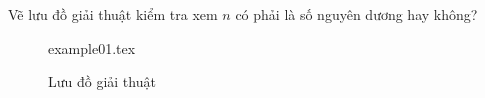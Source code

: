\documentclass[12pt,a4paper]{article}
\begin{document}
Vẽ lưu đồ giải thuật kiểm tra xem \(n\) có phải là số nguyên dương hay không?

\begin{figure}[htp]
    \begin{center}
        {example01.tex}
    \end{center}
    \caption{Lưu đồ giải thuật}
\end{figure}
\end{document}
